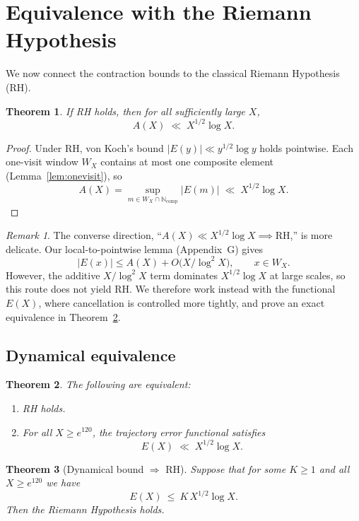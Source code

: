 \documentclass[11pt]{article}
\theoremstyle{plain}
\newtheorem{theorem}{Theorem}[section]
\theoremstyle{definition}
\theoremstyle{remark}
\newtheorem*{remark}{Remark}
\begin{document}
\section{Equivalence with the Riemann Hypothesis}\label{sec:equivalence}

We now connect the contraction bounds to the classical Riemann Hypothesis (RH).

\begin{theorem}\label{thm:A_bound}
If RH holds, then for all sufficiently large $X$,
\[
A(X)\;\ll\;X^{1/2}\log X.
\]
\end{theorem}

\begin{proof}
Under RH, von Koch’s bound $|E(y)|\ll y^{1/2}\log y$ holds pointwise. Each one-visit window $W_X$ contains at most one composite element (Lemma~\ref{lem:onevisit}), so
\[
A(X)=\sup_{m\in W_X\cap\mathbb{N}_{\mathrm{comp}}}|E(m)|\;\ll\;X^{1/2}\log X.
\]
\end{proof}

\begin{remark}
The converse direction, “$A(X)\ll X^{1/2}\log X \implies \mathrm{RH}$,” is more delicate. Our local-to-pointwise lemma (Appendix~G) gives
\[
|E(x)|\le A(X)+O\!\big(X/\log^2X\big), \qquad x\in W_X.
\]
However, the additive $X/\log^2X$ term dominates $X^{1/2}\log X$ at large scales, so this route does not yield RH. We therefore work instead with the functional $E(X)$, where cancellation is controlled more tightly, and prove an exact equivalence in Theorem~\ref{thm:E_equiv}.
\end{remark}

\subsection{Dynamical equivalence}

\begin{theorem}\label{thm:E_equiv}
The following are equivalent:
\begin{enumerate}
\item RH holds.
\item For all $X\ge e^{120}$, the trajectory error functional satisfies
\[
E(X)\;\ll\;X^{1/2}\log X.
\]
\end{enumerate}
\end{theorem}

\begin{theorem}[Dynamical bound $\Rightarrow$ RH]\label{thm:ReverseImpliesRH}
Suppose that for some $K\ge 1$ and all $X\ge e^{120}$ we have
\[
E(X)\ \le\ K\,X^{1/2}\log X.
\]
Then the Riemann Hypothesis holds.
\end{theorem}
\end{document}
